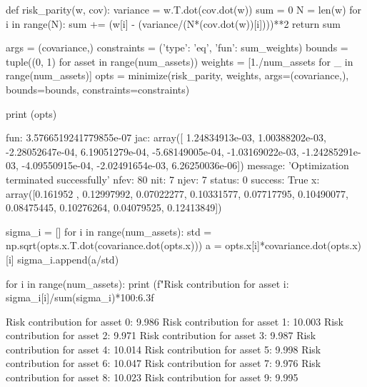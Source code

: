 \cprotEnv \begin{solution}
\begin{ipython}
def risk_parity(w, cov):
    variance = w.T.dot(cov.dot(w))
    sum = 0 
    N = len(w)
    for i in range(N):
        sum += (w[i] - (variance/(N*(cov.dot(w))[i])))**2
    return sum

args = (covariance,)
constraints = ({'type': 'eq', 'fun': sum_weights})
bounds = tuple((0, 1) for asset in range(num_assets))
weights = [1./num_assets for _ in range(num_assets)]
opts = minimize(risk_parity, weights, args=(covariance,),
                bounds=bounds, constraints=constraints)

print (opts)
\end{ipython}
\begin{ioutput}
     fun: 3.5766519241779855e-07
     jac: array([ 1.24834913e-03,  1.00388202e-03, -2.28052647e-04,  6.19051279e-04,
                 -5.68149005e-04, -1.03169022e-03, -1.24285291e-03, -4.09550915e-04,
                 -2.02491654e-03,  6.26250036e-06])
 message: 'Optimization terminated successfully'
    nfev: 80
     nit: 7
    njev: 7
  status: 0
 success: True
       x: array([0.161952  , 0.12997992, 0.07022277, 0.10331577, 0.07717795,
                 0.10490077, 0.08475445, 0.10276264, 0.04079525, 0.12413849])
\end{ioutput}
\begin{ipython}
sigma_i = []
for i in range(num_assets):
    std = np.sqrt(opts.x.T.dot(covariance.dot(opts.x)))
    a = opts.x[i]*covariance.dot(opts.x)[i]
    sigma_i.append(a/std)

for i in range(num_assets):
    print (f"Risk contribution for asset {i}: {sigma_i[i]/sum(sigma_i)*100:6.3f}%
\end{ipython}
\begin{ioutput}
Risk contribution for asset 0:  9.986%
Risk contribution for asset 1: 10.003%
Risk contribution for asset 2:  9.971%
Risk contribution for asset 3:  9.987%
Risk contribution for asset 4: 10.014%
Risk contribution for asset 5:  9.998%
Risk contribution for asset 6: 10.047%
Risk contribution for asset 7:  9.976%
Risk contribution for asset 8: 10.023%
Risk contribution for asset 9:  9.995%
\end{ioutput}
\end{solution}

